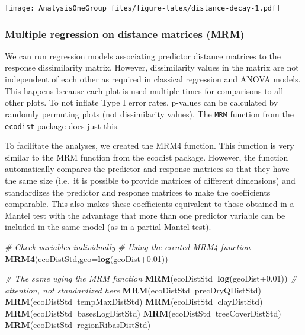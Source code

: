 \documentclass[]{article}
\newenvironment{Shaded}{\begin{snugshade}}{\end{snugshade}}
\newcommand{\CommentTok}[1]{\textcolor[rgb]{0.56,0.35,0.01}{\textit{#1}}}
\newcommand{\DataTypeTok}[1]{\textcolor[rgb]{0.13,0.29,0.53}{#1}}
\newcommand{\FloatTok}[1]{\textcolor[rgb]{0.00,0.00,0.81}{#1}}
\newcommand{\KeywordTok}[1]{\textcolor[rgb]{0.13,0.29,0.53}{\textbf{#1}}}
\newcommand{\NormalTok}[1]{#1}
\newcommand{\OperatorTok}[1]{\textcolor[rgb]{0.81,0.36,0.00}{\textbf{#1}}}
\begin{document}
\texttt{[image: AnalysisOneGroup\_files/figure-latex/distance-decay-1.pdf]}

\hypertarget{multiple-regression-on-distance-matrices-mrm}{%
\subsubsection{Multiple regression on distance matrices
(MRM)}\label{multiple-regression-on-distance-matrices-mrm}}

We can run regression models associating predictor distance matrices to
the response dissimilarity matrix. However, dissimilarity values in the
matrix are not independent of each other as required in classical
regression and ANOVA models. This happens because each plot is used
multiple times for comparisons to all other plots. To not inflate Type I
error rates, p-values can be calculated by randomly permuting plots (not
dissimilarity values). The \texttt{MRM} function from the
\texttt{ecodist} package does just this.

To facilitate the analyses, we created the MRM4 function. This function
is very similar to the MRM function from the ecodist package. However,
the function automatically compares the predictor and response matrices
so that they have the same size (i.e.~it is possible to provide matrices
of different dimensions) and standardizes the predictor and response
matrices to make the coefficients comparable. This also makes these
coefficients equivalent to those obtained in a Mantel test with the
advantage that more than one predictor variable can be included in the
same model (as in a partial Mantel test).

\begin{Shaded}
\begin{Highlighting}[]
\CommentTok{# Check variables individually}
\CommentTok{# Using the created MRM4 function}
\KeywordTok{MRM4}\NormalTok{(ecoDistStd,}\DataTypeTok{geo=}\KeywordTok{log}\NormalTok{(geoDist}\FloatTok{+0.01}\NormalTok{))}

\CommentTok{# The same uging the MRM function}
\KeywordTok{MRM}\NormalTok{(ecoDistStd}\OperatorTok{~}\KeywordTok{log}\NormalTok{(geoDist}\FloatTok{+0.01}\NormalTok{)) }\CommentTok{# attention, not standardized here}
\KeywordTok{MRM}\NormalTok{(ecoDistStd}\OperatorTok{~}\NormalTok{precDryQDistStd)}
\KeywordTok{MRM}\NormalTok{(ecoDistStd}\OperatorTok{~}\NormalTok{tempMaxDistStd)}
\KeywordTok{MRM}\NormalTok{(ecoDistStd}\OperatorTok{~}\NormalTok{clayDistStd)}
\KeywordTok{MRM}\NormalTok{(ecoDistStd}\OperatorTok{~}\NormalTok{basesLogDistStd)}
\KeywordTok{MRM}\NormalTok{(ecoDistStd}\OperatorTok{~}\NormalTok{treeCoverDistStd)}
\KeywordTok{MRM}\NormalTok{(ecoDistStd}\OperatorTok{~}\NormalTok{regionRibasDistStd)}
\end{Highlighting}
\end{Shaded}
\end{document}
